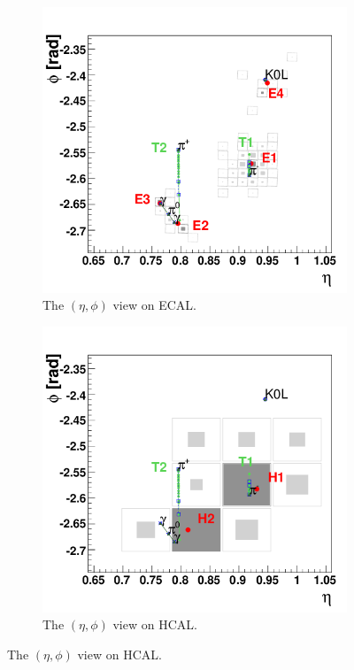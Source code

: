\begin{figure}
	\begin{subfigure}{.4\textwidth}
		\centering
		\includegraphics[width=.8\linewidth]{analysis/pics/PF_b.png}
		\caption{The $(\eta,\phi)$ view on ECAL.}
		\label{fig:PF_b}
	\end{subfigure}
		\begin{subfigure}{.4\textwidth}
			\centering
			\includegraphics[width=.8\linewidth]{analysis/pics/PF_c.png}
			\caption{The $(\eta,\phi)$ view on HCAL.}
			\label{fig:PF_c}
		\end{subfigure}%

\end{figure}
